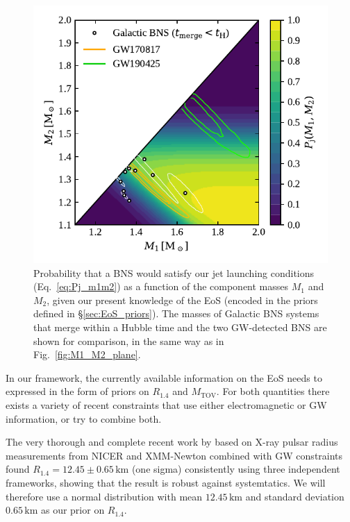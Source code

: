 \documentclass[]{aa}
\newcommand{\resp}[1]{#1}
\begin{document}
\begin{figure}
 \centering
 \includegraphics[width=\columnwidth]{figures/Pjet_m1m2.pdf}
 \caption{Probability that a BNS would satisfy our jet launching conditions (Eq.~\ref{eq:Pj_m1m2}) as a function of the component masses $M_1$ and $M_2$, given our present knowledge of the EoS (encoded in the priors defined in \S\ref{sec:EoS_priors}). The masses of Galactic BNS systems that merge within a Hubble time and the two GW-detected BNS are shown for comparison, in the same way as in Fig.~\ref{fig:M1_M2_plane}.} 
 \label{fig:Pjet_m1m2}
\end{figure}
 
In our framework, the currently available information on the EoS needs to expressed in the form of priors on $R_{1.4}$ and $M_\mathrm{TOV}$. For both quantities there exists a variety of recent constraints that use either electromagnetic or GW information, or try to combine both. 

The very thorough and complete recent work by \cite{Miller2021} based on X-ray pulsar radius measurements from NICER and XMM-Newton combined with GW constraints found $R_{1.4}=12.45\pm 0.65\,\mathrm{km}$ (one sigma) consistently using three independent frameworks, showing that the result is \resp{robust} against systemtatics. We will therefore use a normal distribution with mean $12.45\,\mathrm{km}$ and standard deviation $0.65\,\mathrm{km}$ as our prior on $R_{1.4}$. 
\end{document}

